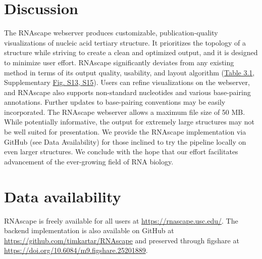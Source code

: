 \section{Discussion}

The RNAscape webserver produces customizable, publication-quality visualizations of nucleic acid tertiary structure. It prioritizes the topology of a structure while striving to create a clean and optimized output, and it is designed to minimize user effort. RNAscape significantly deviates from any existing method in terms of its output quality, usability, and layout algorithm (\hyperref[table:rnascape]{Table 3.1}, Supplementary \hyperref[fig:rnascapeS3]{Fig. S13, S15}). Users can refine visualizations on the webserver, and RNAscape also supports non-standard nucleotides and various base-pairing annotations. Further updates to base-pairing conventions may be easily incorporated. The RNAscape webserver allows a maximum file size of 50 MB. While potentially informative, the output for extremely large structures may not be well suited for presentation. We provide the RNAscape implementation via GitHub (see Data Availability) for those inclined to try the pipeline locally on even larger structures. We conclude with the hope that our effort facilitates advancement of the ever-growing field of RNA biology.


\section{Data availability}

RNAscape is freely available for all users at \url{https://rnascape.usc.edu/}. The backend implementation is also available on GitHub at \url{https://github.com/timkartar/RNAscape} and preserved through figshare at \url{https://doi.org/10.6084/m9.figshare.25201889}.